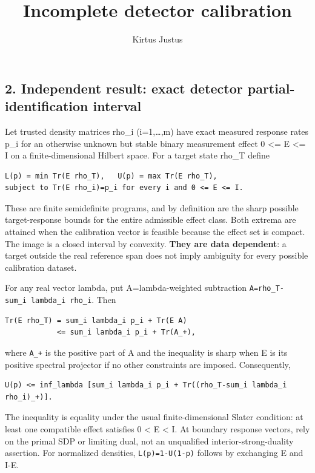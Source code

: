 \documentclass[
  10pt,
  a4paper,
]{article}
\title{Incomplete detector calibration}
\author{Kirtus Justus}
\date{}
\begin{document}
\maketitle

\subsection{2. Independent result: exact detector partial-identification interval}\label{independent-result-exact-detector-partial-identification-interval}

Let trusted density matrices rho\_i (i=1,\ldots,m) have exact measured response rates p\_i for an otherwise unknown but stable binary measurement effect 0 \textless= E \textless= I on a finite-dimensional Hilbert space. For a target state rho\_T define

\begin{verbatim}
L(p) = min Tr(E rho_T),   U(p) = max Tr(E rho_T),
subject to Tr(E rho_i)=p_i for every i and 0 <= E <= I.
\end{verbatim}

These are finite semidefinite programs, and by definition are the sharp possible target-response bounds for the entire admissible effect class. Both extrema are attained when the calibration vector is feasible because the effect set is compact. The image is a closed interval by convexity. \textbf{They are data dependent}: a target outside the real reference span does not imply ambiguity for every possible calibration dataset.

For any real vector lambda, put A=lambda-weighted subtraction \texttt{A=rho\_T-sum\_i\ lambda\_i\ rho\_i}. Then

\begin{verbatim}
Tr(E rho_T) = sum_i lambda_i p_i + Tr(E A)
            <= sum_i lambda_i p_i + Tr(A_+),
\end{verbatim}

where \texttt{A\_+} is the positive part of A and the inequality is sharp when E is its positive spectral projector if no other constraints are imposed. Consequently,

\begin{verbatim}
U(p) <= inf_lambda [sum_i lambda_i p_i + Tr((rho_T-sum_i lambda_i rho_i)_+)].
\end{verbatim}

The inequality is equality under the usual finite-dimensional Slater condition: at least one compatible effect satisfies 0 \textless{} E \textless{} I. At boundary response vectors, rely on the primal SDP or limiting dual, not an unqualified interior-strong-duality assertion. For normalized densities, \texttt{L(p)=1-U(1-p)} follows by exchanging E and I-E.
\end{document}
